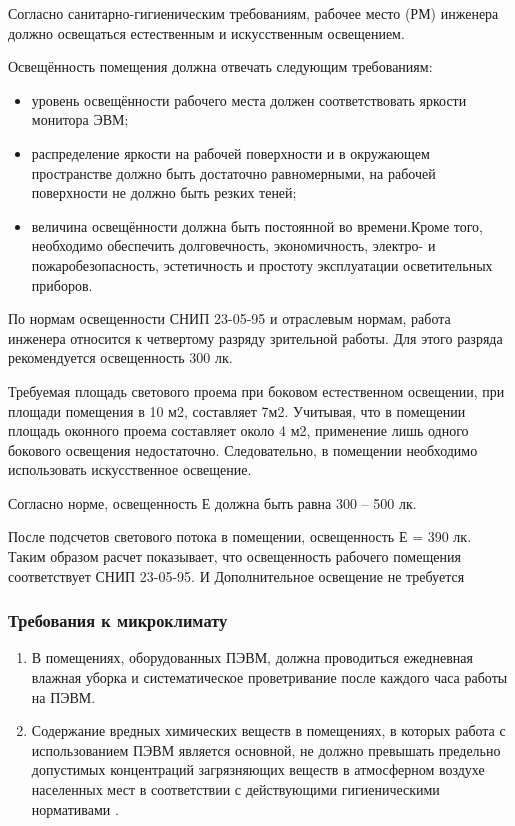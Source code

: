 Согласно санитарно-гигиеническим требованиям, рабочее место (РМ) инженера должно освещаться естественным и искусственным освещением.

Освещённость помещения должна отвечать следующим требованиям:
\begin{itemize}
  \item  уровень освещённости рабочего места должен соответствовать яркости монитора ЭВМ;
  \item  распределение яркости на рабочей поверхности и в окружающем пространстве должно быть достаточно равномерными, на рабочей поверхности не должно быть резких теней;
  \item  величина освещённости должна быть постоянной во времени.Кроме того, необходимо обеспечить долговечность, экономичность, электро- и пожаробезопасность, эстетичность и простоту эксплуатации осветительных приборов.
\end{itemize}

По нормам освещенности СНИП 23-05-95 и отраслевым нормам, работа инженера относится к четвертому разряду зрительной работы. Для этого разряда рекомендуется освещенность 300 лк. 

Требуемая площадь светового проема при боковом естественном освещении, при площади помещения в 10 м2, составляет 7м2. Учитывая, что в помещении площадь оконного проема составляет около 4 м2, применение лишь одного бокового освещения недостаточно. Следовательно, в помещении необходимо использовать искусственное освещение. 

Согласно норме, освещенность Е должна быть равна 300 – 500 лк. 

После подсчетов светового потока в помещении, освещенность Е = 390 лк. Таким образом расчет показывает, что освещенность рабочего помещения соответствует СНИП 23-05-95. И Дополнительное освещение не требуется

\subsubsection{Требования к микроклимату}
\begin{enumerate}
\item В помещениях, оборудованных ПЭВМ, должна проводиться ежедневная влажная уборка и систематическое проветривание после каждого часа работы на ПЭВМ.
\item Содержание вредных химических веществ в помещениях, в которых работа с использованием ПЭВМ является основной, не должно превышать предельно допустимых концентраций загрязняющих веществ в атмосферном воздухе населенных мест в соответствии с действующими гигиеническими нормативами \cite{bhzd_2}.
\end{enumerate}
